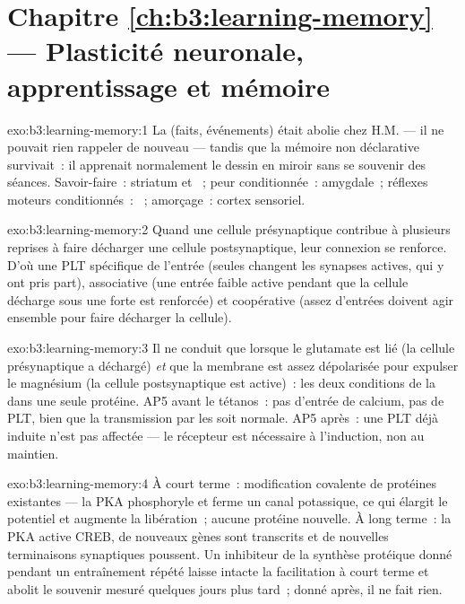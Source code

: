 \section*{Chapitre \ref{ch:b3:learning-memory} --- Plasticité neuronale, apprentissage et mémoire}

\begin{solution}{exo:b3:learning-memory:1}
La  (faits, événements) était abolie chez H.M. --- il
ne pouvait rien rappeler de nouveau --- tandis que la mémoire non
déclarative survivait~: il apprenait normalement le dessin en miroir
sans se souvenir des séances. Savoir-faire~: striatum et ~; peur
conditionnée~: amygdale~; réflexes moteurs conditionnés~: ~;
amorçage~: cortex sensoriel.
\end{solution}

\begin{solution}{exo:b3:learning-memory:2}
Quand une cellule présynaptique contribue à plusieurs reprises à faire
décharger une cellule postsynaptique, leur connexion se renforce. D'où
une PLT spécifique de l'entrée (seules changent les synapses actives,
qui y ont pris part), associative (une entrée faible active pendant que
la cellule décharge sous une forte est renforcée) et coopérative (assez
d'entrées doivent agir ensemble pour faire décharger la cellule).
\end{solution}

\begin{solution}{exo:b3:learning-memory:3}
Il ne conduit que lorsque le glutamate est lié (la cellule présynaptique
a déchargé) \emph{et} que la membrane est assez dépolarisée pour expulser
le magnésium (la cellule postsynaptique est active)~: les deux
conditions de la  dans une seule protéine. AP5 avant le
tétanos~: pas d'entrée de calcium, pas de PLT, bien que la transmission
par les  soit normale. AP5 après~: une PLT déjà induite
n'est pas affectée --- le récepteur est nécessaire à l'induction, non au
maintien.
\end{solution}

\begin{solution}{exo:b3:learning-memory:4}
À court terme~: modification covalente de protéines existantes --- la
PKA phosphoryle et ferme un canal potassique, ce qui élargit le
potentiel et augmente la libération~; aucune protéine nouvelle. À long
terme~: la PKA active CREB, de nouveaux gènes sont transcrits et de
nouvelles terminaisons synaptiques poussent. Un inhibiteur de la
synthèse protéique donné pendant un entraînement répété laisse intacte
la facilitation à court terme et abolit le souvenir mesuré quelques
jours plus tard~; donné après, il ne fait rien.
\end{solution}

